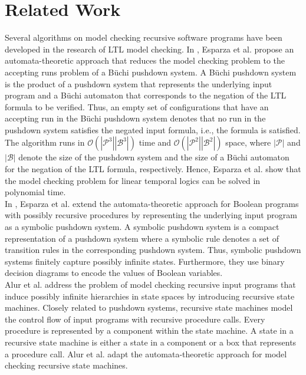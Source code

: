 \documentclass[a4paper, 12pt, twoside]{report}
\begin{document}
	\section{Related Work}
	Several algorithms on model checking recursive software programs have been developed in the research of LTL model checking. In \cite{esparza2000}, Esparza et al. propose an automata-theoretic approach that reduces the model checking problem to the accepting runs problem of a Büchi pushdown system. A Büchi pushdown system is the product of a pushdown system that represents the underlying input program and a Büchi automaton that corresponds to the negation of the LTL formula to be verified. Thus, an empty set of configurations that have an accepting run in the Büchi pushdown system denotes that no run in the pushdown system satisfies the negated input formula, i.e., the formula is satisfied. The algorithm runs in $\mathcal{O}(|\mathcal{P}^3||\mathcal{B}^3|)$ time and $\mathcal{O}(|\mathcal{P}^2||\mathcal{B}^2|)$ space, where $|\mathcal{P}|$ and $|\mathcal{B}|$ denote the size of the pushdown system and the size of a Büchi automaton for the negation of the LTL formula, respectively. Hence, Esparza et al. show that the model checking problem for linear temporal logics can be solved in polynomial time.\\
	
	In \cite{schwoon2001}, Esparza et al. extend the automata-theoretic approach for Boolean programs with possibly recursive procedures by representing the underlying input program as a symbolic pushdown system. A symbolic pushdown system is a compact representation of a pushdown system where a symbolic rule denotes a set of transition rules in the corresponding pushdown system. Thus, symbolic pushdown systems finitely capture possibly infinite states. Furthermore, they use binary decision diagrams to encode the values of Boolean variables.\\
	
	Alur et al. \cite{alur2001analysis} address the problem of model checking recursive input programs that induce possibly infinite hierarchies in state spaces by introducing recursive state machines. Closely related to pushdown systems, recursive state machines model the control flow of input programs with recursive procedure calls. Every procedure is represented by a component within the state machine. A state in a recursive state machine is either a state in a component or a box that represents a procedure call. Alur et al. adapt the automata-theoretic approach for model checking recursive state machines.\\
	
\end{document}
